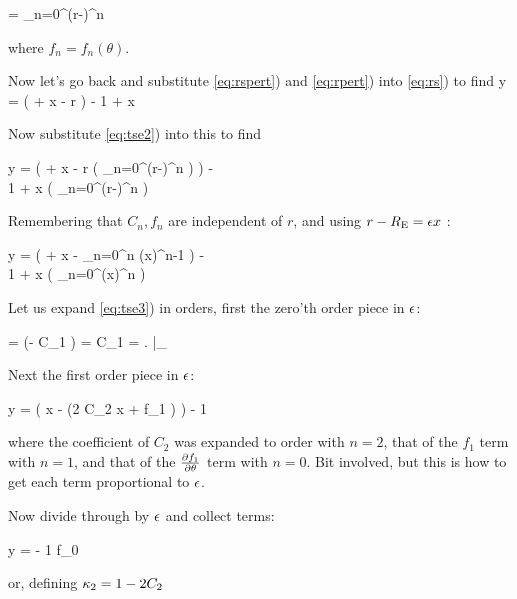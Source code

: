 \beq
\label{eq:tse2}
\phi  = \sum_{n=0}^\infty {} (r-\re)^n
\eeq

where $f_n = f_n(\theta)$.

Now let's go back and substitute \eqref{eq:rspert}) and \eqref{eq:rpert}) into \eqref{eq:rs}) to find
\beq
\eps y = \left( \re + \eps x -  {\prtl  \phi \over \prtl r} \right)  - {1 \over \re + \eps x}  {\prtl  \phi \over \prtl \theta} \hat{\theta}
\eeq

Now substitute \eqref{eq:tse2}) into this to find

\bea
\eps y = \left( \re + \eps x -  {\prtl \over \prtl r} \left( \sum_{n=0}^\infty {} (r-\re)^n  \right) \right)  - \\
{1 \over \re + \eps x}  {\prtl  \over \prtl \theta} \left( \sum_{n=0}^\infty {} (r-\re)^n  \right)  \hat{\theta} \nonumber
\eea

Remembering that $C_n, f_n$ are independent of $r$, and using $r-R_{\mathrm{E}} = \epsilon x$ :

\bea
\label{eq:tse3}
\eps y = \left( \re + \eps x -   \sum_{n=0}^\infty {} n (\eps x)^{n-1}  \right)  - \\
{1 \over \re + \eps x}  {\prtl  \over \prtl \theta} \left( \sum_{n=0}^\infty {} (\eps x)^n  \right)  \hat{\theta} \nonumber
\eea

Let us expand \eqref{eq:tse3}) in orders, first the zero'th order piece in $\epsilon$:


 =  \left(\re - C_1 \right)  \rightarrow \re = C_1 = \left. \prtl \phi \over \prtl \theta \right|_{\re}
\eeq


Next the first order piece in $\epsilon$:

\beq
\eps y = \left( \eps x - (2 C_2 \eps x + \eps f_1 ) \right)  - {1 \over \re}  \hat{\theta}
\eeq

where the coefficient of $C_2$ was expanded to order with $n=2$, that of the $f_1$ term with $n=1$, and that of the $\partial f_1 \over \partial \theta$ term with $n=0$.  Bit involved, but this is how to get each term proportional to $\epsilon$.

Now divide through by $\epsilon$ and collect terms:

\beq
 y = \left[ (1-2 C_2) x -  f_1 \right]  - {1 \over \re} {\prtl f_0 \over \prtl \te} \hat{\theta}
\eeq

or, defining $\kappa_2 = 1-2 C_2$

